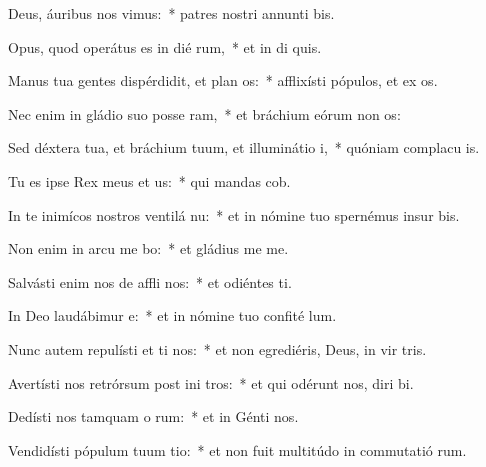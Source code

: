 \item Deus, áuribus nos vimus:~* patres nostri annunti bis.
\item Opus, quod operátus es in dié rum,~* et in di quis.
\item Manus tua gentes dispérdidit, et plan os:~* afflixísti pópulos, et ex os.
\item Nec enim in gládio suo posse ram,~* et bráchium eórum non  os:
\item Sed déxtera tua, et bráchium tuum, et illuminátio  i,~* quóniam complacu  is.
\item Tu es ipse Rex meus et  us:~* qui mandas  cob.
\item In te inimícos nostros ventilá nu:~* et in nómine tuo spernémus insur  bis.
\item Non enim in arcu me bo:~* et gládius me   me.
\item Salvásti enim nos de affli nos:~* et odiéntes  ti.
\item In Deo laudábimur  e:~* et in nómine tuo confité  lum.
\item Nunc autem repulísti et ti nos:~* et non egrediéris, Deus, in vir tris.
\item Avertísti nos retrórsum post ini tros:~* et qui odérunt nos, diri bi.
\item Dedísti nos tamquam o rum:~* et in Génti  nos.
\item Vendidísti pópulum tuum  tio:~* et non fuit multitúdo in commutatió rum.
